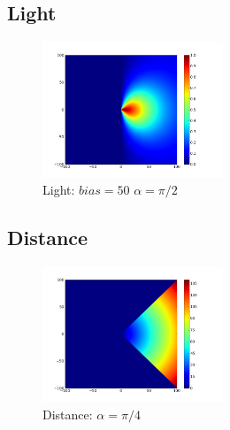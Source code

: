 \documentclass[a4paper]{article}
\begin{document}
\subsection{Light}

\begin{figure}
	\vspace{-30pt}
	\begin{center}
		\includegraphics[width=0.48\textwidth]{graphs/light.png}
	\end{center}
	\vspace{-30pt}
	\caption{Light: $bias=50$ $\alpha=\pi/2$}
\end{figure}

\subsection{Distance}
\begin{figure}
	\vspace{-30pt}
	\begin{center}
		\includegraphics[width=0.48\textwidth]{graphs/distance.png}
	\end{center}
	\vspace{-30pt}
	\caption{Distance: $\alpha=\pi/4$}
\end{figure}
\end{document}
